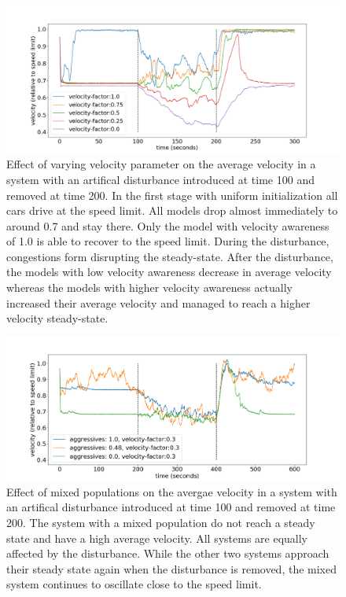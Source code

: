 \documentclass[11pt,a4paper,twocolumn]{article}
\begin{document}
 
\begin{figure}[t]
    \centering
      \includegraphics[scale=0.35, trim={0 0 0 0 }]{figs/velocity_over_time.png}
      \caption{Effect of varying velocity parameter on the average velocity in a system with an artifical disturbance introduced at time 100 and removed at time 200. In the first stage with uniform initialization all cars drive at the speed limit. All models drop almost immediately to around 0.7 and stay there. Only the model with velocity awareness of 1.0 is able to recover to the speed limit. During the disturbance, congestions form disrupting the steady-state. After the disturbance, the models with low velocity awareness decrease in average velocity whereas the models with higher velocity awareness actually increased their average velocity and managed to reach a higher velocity steady-state.}
      \label{fig:vel_over_time}
\end{figure}
 
\begin{figure}[t]     
      \centering
       \includegraphics[scale=0.35]{figs/velocity_over_time_aggressive.png}
       \caption{Effect of mixed populations on the avergae velocity in a system with an artifical disturbance introduced at time 100 and removed at time 200. The system with a mixed population do not reach a steady state and have a high average velocity. All systems are equally affected by the disturbance. While the other two systems approach their steady state again when the disturbance is removed, the mixed system continues to oscillate close to the speed limit. }
       \label{fig:vel_agg_over_time}
 \end{figure}
\end{document}
